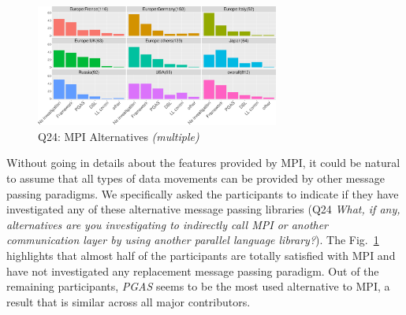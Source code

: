 \documentclass[preprint,5p,times]{elsarticle}
\def\myquote#1{{\it #1}}
\def\mcountries{major contributors\xspace{}}%
\begin{document}
\begin{figure}[tb]
\begin{center}
\includegraphics[width=8.0cm]{R-scripts/Q24.pdf}
\vspace{-1.5mm}
\caption{Q24: MPI Alternatives {\it(multiple)}}
\label{fig:mpi-alternatives}
\vspace{-3mm}%
\end{center}
\end{figure}

Without going in details about the features provided by MPI, it could be natural
to assume that all types of data movements can be provided by other message
passing paradigms. We specifically asked the participants to indicate if they
have investigated any of these alternative message passing libraries (Q24
\myquote{What, if any, alternatives are you investigating to indirectly call MPI
or another communication layer by using another parallel language library?}).
The Fig.~\ref{fig:mpi-alternatives} highlights that almost half of the
participants are totally satisfied with MPI and have not investigated any
replacement message passing paradigm. Out of the remaining participants,
\myquote{PGAS} seems to be the most used alternative to MPI, a result that is
similar across all \mcountries.

\end{document}
